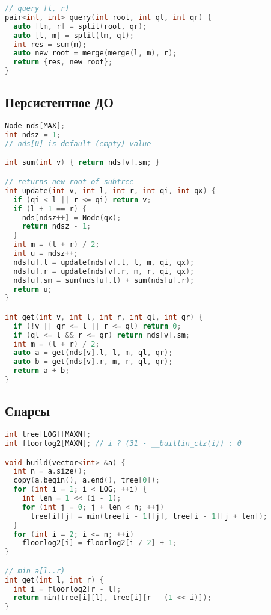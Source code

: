 \documentclass[9pt,a4paper,landscape,twosided]{extarticle}
\begin{document}
\begin{multicols*}{3}
\begin{lstlisting}[language=C++]
// query [l, r)
pair<int, int> query(int root, int ql, int qr) {
  auto [lm, r] = split(root, qr);
  auto [l, m] = split(lm, ql);
  int res = sum(m);
  auto new_root = merge(merge(l, m), r);
  return {res, new_root};
}

\end{lstlisting}

\subsection{Персистентное ДО}
\begin{lstlisting}[language=C++]
Node nds[MAX];
int ndsz = 1;
// nds[0] is default (empty) value

int sum(int v) { return nds[v].sm; }

// returns new root of subtree
int update(int v, int l, int r, int qi, int qx) {
  if (qi < l || r <= qi) return v;
  if (l + 1 == r) {
    nds[ndsz++] = Node(qx);
    return ndsz - 1;
  }
  int m = (l + r) / 2;
  int u = ndsz++;
  nds[u].l = update(nds[v].l, l, m, qi, qx);
  nds[u].r = update(nds[v].r, m, r, qi, qx);
  nds[u].sm = sum(nds[u].l) + sum(nds[u].r);
  return u;
}

int get(int v, int l, int r, int ql, int qr) {
  if (!v || qr <= l || r <= ql) return 0;
  if (ql <= l && r <= qr) return nds[v].sm;
  int m = (l + r) / 2;
  auto a = get(nds[v].l, l, m, ql, qr);
  auto b = get(nds[v].r, m, r, ql, qr);
  return a + b;
}

\end{lstlisting}

\subsection{Спарсы}
\begin{lstlisting}[language=C++]
int tree[LOG][MAXN];
int floorlog2[MAXN]; // i ? (31 - __builtin_clz(i)) : 0

void build(vector<int> &a) {
  int n = a.size();
  copy(a.begin(), a.end(), tree[0]);
  for (int i = 1; i < LOG; ++i) {
    int len = 1 << (i - 1);
    for (int j = 0; j + len < n; ++j)
      tree[i][j] = min(tree[i - 1][j], tree[i - 1][j + len]);
  }
  for (int i = 2; i <= n; ++i)
    floorlog2[i] = floorlog2[i / 2] + 1;
}

// min a[l..r)
int get(int l, int r) {
  int i = floorlog2[r - l];
  return min(tree[i][l], tree[i][r - (1 << i)]);
}

\end{lstlisting}


\end{multicols*}
\end{document}
